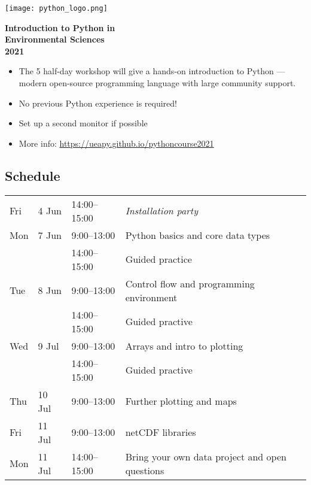 \documentclass[paper=a4]{scrartcl}
\newcommand*{\pyitem}{\item [{\texttt{[image: python\_logo.png]}}]}
\begin{document}
\pagestyle{empty} %

\begin{center}
\begin{minipage}{0.2\linewidth}
    \texttt{[image: python\_logo.png]}
    \vspace{0.5cm}
\end{minipage}

\huge \textbf{Introduction to Python in \\ Environmental Sciences \\ 2021}

\end{center}

\begin{itemize}
\pyitem The 5 half-day workshop will give a hands-on introduction to Python --- modern open-source programming language with large community support.
\pyitem No previous Python experience is required!
\pyitem Set up a second monitor if possible
\pyitem More info: \url{https://ueapy.github.io/pythoncourse2021}
\end{itemize}


\subsection*{Schedule}
\begin{center}
\begin{tabular}{llll}
Fri & 4 Jun  & 14:00--15:00 & \textit {Installation party}\\
Mon & 7 Jun  & 9:00--13:00 & Python basics and core data types\\
    &        & 14:00--15:00 & Guided practice \\
Tue & 8 Jun  & 9:00--13:00 & Control flow and programming environment \\
    &        & 14:00--15:00 & Guided practive \\
Wed & 9 Jul  & 9:00--13:00 & Arrays and intro to plotting\\
    &        & 14:00--15:00 & Guided practive \\
Thu & 10 Jul & 9:00--13:00 & Further plotting and maps \\
Fri & 11 Jul & 9:00--13:00 & netCDF libraries\\
Mon & 11 Jul & 14:00--15:00 & Bring your own data project and open questions\\

\end{tabular}
\end{center}
\end{document}
